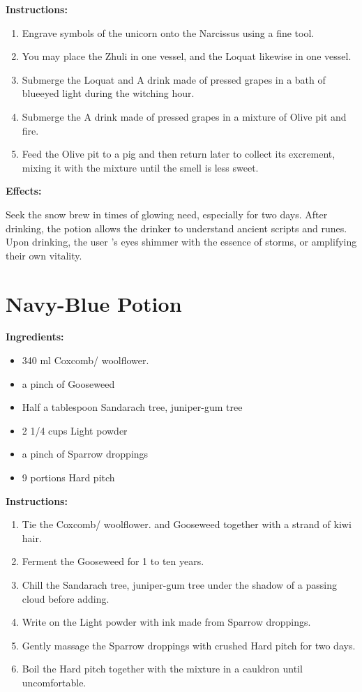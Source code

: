 \documentclass{article}
\begin{document}
\textbf{Instructions:}

\begin{enumerate}
  \item Engrave symbols of the unicorn onto the Narcissus using a fine tool.
  \item You may place the Zhuli in one vessel, and the Loquat likewise in one vessel.
  \item Submerge the Loquat and A drink made of pressed grapes in a bath of blueeyed light during the witching hour.
  \item Submerge the A drink made of pressed grapes in a mixture of Olive pit and fire.
  \item Feed the Olive pit to a pig and then return later to collect its excrement, mixing it with the mixture until the smell is less sweet.
\end{enumerate}

\textbf{Effects:}

Seek the snow brew in times of glowing need, especially for two days. After drinking, the potion allows the drinker to understand ancient scripts and runes. Upon drinking, the user 's eyes shimmer with the essence of storms, or amplifying their own vitality.

\newpage
\section*{Navy-Blue Potion}

\textbf{Ingredients:}

\begin{itemize}
  \item 340 ml Coxcomb/ woolflower.
  \item a pinch of Gooseweed
  \item Half a tablespoon Sandarach tree, juniper-gum tree
  \item 2 1/4 cups Light powder
  \item a pinch of Sparrow droppings
  \item 9 portions Hard pitch
\end{itemize}

\textbf{Instructions:}

\begin{enumerate}
  \item Tie the Coxcomb/ woolflower. and Gooseweed together with a strand of kiwi hair.
  \item Ferment the Gooseweed for 1 to ten years.
  \item Chill the Sandarach tree, juniper-gum tree under the shadow of a passing cloud before adding.
  \item Write on the Light powder with ink made from Sparrow droppings.
  \item Gently massage the Sparrow droppings with crushed Hard pitch for two days.
  \item Boil the Hard pitch together with the mixture in a cauldron until uncomfortable.
\end{enumerate}
\end{document}
